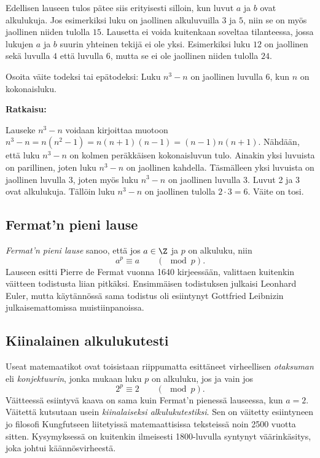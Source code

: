 Edellisen lauseen tulos pätee siis erityisesti silloin, kun luvut $a$ ja $b$ ovat alkulukuja. Jos esimerkiksi luku on jaollinen alkuluvuilla $3$ ja $5$, niin se on myös jaollinen niiden tulolla $15$. Lausetta ei voida kuitenkaan soveltaa tilanteessa, jossa lukujen $a$ ja $b$ suurin yhteinen tekijä ei ole yksi. Esimerkiksi luku $12$ on jaollinen sekä luvulla $4$ että luvulla $6$, mutta se ei ole jaollinen niiden tulolla $24$.

\begin{esimerkki}
Osoita väite todeksi tai epätodeksi: Luku $n^3 - n$ on jaollinen luvulla $6$, kun $n$ on
kokonaisluku.


{\bf Ratkaisu:}

Lauseke $n^3 - n$ voidaan kirjoittaa muotoon $n^3 - n = n(n^2
- 1) = n(n + 1)(n - 1) = (n - 1)n(n + 1)$. Nähdään, että luku
$n^3 - n$ on kolmen peräkkäisen kokonaisluvun tulo. Ainakin
yksi luvuista on parillinen, joten luku $n^3 - n$ on jaollinen
kahdella. Täsmälleen yksi luvuista on jaollinen luvulla $3$,
joten myös luku $n^3 - n$ on jaollinen luvulla $3$. Luvut 2 ja
3 ovat alkulukuja. Tällöin luku $n^3 - n$ on jaollinen tulolla
$2 \cdot 3 = 6$. Väite on tosi.
\end{esimerkki}

\subsection*{Fermat'n pieni lause} {\em Fermat'n pieni lause} sanoo, että jos $a\in\Z$ ja $p$ on alkuluku, niin 
\[
a^p \equiv a \qquad (\mod p).
\]
Lauseen esitti Pierre de Fermat vuonna 1640 kirjeessään, valittaen kuitenkin väitteen todistusta liian pitkäksi. Ensimmäisen todistuksen julkaisi Leonhard Euler, mutta käytännössä sama todistus oli esiintynyt Gottfried Leibnizin julkaisemattomissa muistiinpanoissa.

\subsection*{Kiinalainen alkulukutesti}
Useat matemaatikot ovat toisistaan riippumatta esittäneet virheellisen {\em otaksuman} eli {\em konjektuurin}, jonka mukaan luku $p$ on alkuluku, jos ja vain jos
\[
2^p \equiv 2 \qquad (\mod p).
\]
Väitteessä esiintyvä kaava on sama kuin Fermat'n pienessä lauseessa, kun $a=2$. Väitettä kutsutaan usein {\em kiinalaiseksi alkulukutestiksi}. Sen on väitetty esiintyneen jo filosofi Kungfutseen liitetyissä matemaattisissa teksteissä noin 2500 vuotta sitten. Kysymyksessä on kuitenkin ilmeisesti 1800-luvulla syntynyt väärinkäsitys, joka johtui  kään\-nös\-vir\-hees\-tä.

